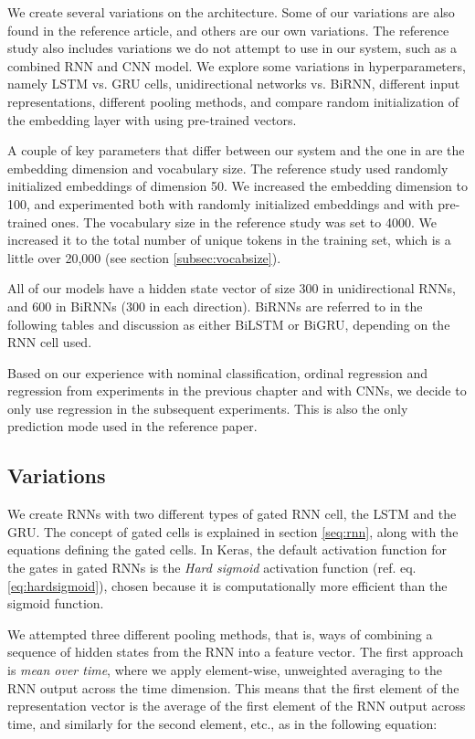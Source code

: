 We create several variations on the architecture. Some of our variations are
also found in the reference article, and others are our own variations. The
reference study also includes variations we do not attempt to use in our
system, such as a combined \ac{RNN} and \ac{CNN} model. We explore some
variations in hyperparameters, namely LSTM vs. GRU cells, unidirectional
networks vs. BiRNN, different input representations, different pooling
methods, and compare random initialization of the embedding layer with using
pre-trained vectors.

A couple of key parameters that differ between our system and the one in
\textcite{taghipour16} are the embedding dimension and vocabulary size. The
reference study used randomly initialized embeddings of dimension 50. We
increased the embedding dimension to 100, and experimented both with randomly
initialized embeddings and with pre-trained ones. The vocabulary size in the
reference study was set to 4000. We increased it to the total number of
unique tokens in the training set, which is a little over 20,000 (see section
\ref{subsec:vocabsize}).

All of our models have a hidden state vector of size 300 in unidirectional
\acp{RNN}, and 600 in BiRNNs (300 in each direction). BiRNNs are referred to
in the following tables and discussion as either BiLSTM or BiGRU, depending
on the RNN cell used.

Based on our experience with nominal classification, ordinal regression and
regression from experiments in the previous chapter and with \acp{CNN}, we
decide to only use regression in the subsequent experiments. This is also the
only prediction mode used in the reference paper.


\subsection{Variations}

We create \acp{RNN} with two different types of gated \ac{RNN} cell, the
\ac{LSTM} and the \ac{GRU}. The concept of gated cells is explained in
section \ref{seq:rnn}, along with the equations defining the gated cells. In
Keras, the default activation function for the gates in gated RNNs is the
\emph{Hard sigmoid} activation function (ref. eq. \ref{eq:hardsigmoid}),
chosen because it is computationally more efficient than the sigmoid
function.

We attempted three different pooling methods, that is, ways of combining a
sequence of hidden states from the \ac{RNN} into a feature vector. The first
approach is \emph{mean over time}, where we apply element-wise, unweighted
averaging to the RNN output across the time dimension. This means that the
first element of the representation vector is the average of the first
element of the RNN output across time, and similarly for the second element,
etc., as in the following equation:

